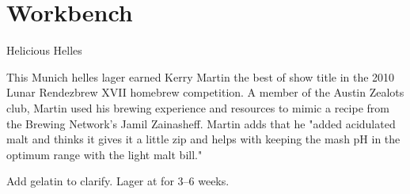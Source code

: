 \documentclass[fontsize=9pt,oneside]{scrbook}
\begin{document}
\mainmatter
\twocolumn

\part{Workbench}

\begin{recipie}{Helicious Helles}

\begin{aboutblock}
This Munich helles lager earned Kerry Martin the best of show title in the 2010
Lunar Rendezbrew XVII homebrew competition. A member of the Austin Zealots club,
Martin used his brewing experience and resources to mimic a recipe from the
Brewing Network’s Jamil Zainasheff. Martin adds that he "added acidulated
malt and thinks it gives it a little zip and helps with keeping the mash pH in
the optimum range with the light malt bill." \sourceaha
\end{aboutblock}


\begin{methodandtiming}
 
\begin{mashsteps}
\end{mashsteps}

\begin{fermentationsteps}
\end{fermentationsteps}

\begin{directions}
Add gelatin to clarify. Lager at  for 3--6 weeks.
\end{directions}

\end{methodandtiming}

\pagebreak

\begin{ingredientsblock}

\begin{malts}
\end{malts}

\begin{hops}
\end{hops}


\end{ingredientsblock}

\end{recipie}

\backmatter


\end{document}
